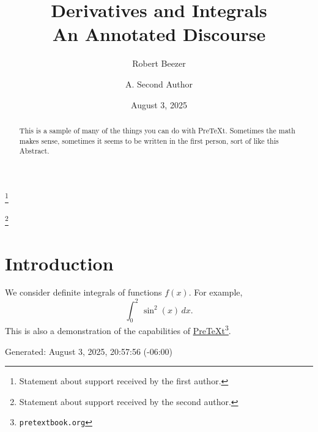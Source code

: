 \documentclass{amsart}
\theoremstyle{plain}%
\theoremstyle{definition}%
\theoremstyle{remark}%
\numberwithin{equation}{section}
\newcommand{\definiteintegral}[4]{\int_{#1}^{#2}\,#3\,d#4}
\begin{document}
%
\title[Derivatives and Integrals]{Derivatives and Integrals\\
{\small An Annotated Discourse}}
\author{Robert Beezer}
\address{Department of Mathematics and Computer Science\\
University of Puget Sound\\
Tacoma, Washington, USA
}
\thanks{Statement about support received by the first author.}
\author{A. Second Author}
\address{Department of Mathematics\\
University of Somewhere\\
Anytown, USA
}
\thanks{Statement about support received by the second author.}
\date{August 3, 2025}
\begin{abstract}
This is a sample of many of the things you can do with PreTeXt.  Sometimes the math makes sense, sometimes it seems to be written in the first person, sort of like this Abstract.%
\end{abstract}
\maketitle
%
%
\typeout{************************************************}
\typeout{************************************************}
%
\section{Introduction}\label{section-introduction}%
We consider definite integrals of functions \(f(x)\).  For example,%
\begin{equation*}
\definiteintegral{0}{2}{\sin^2(x)}{x}\text{.}
\end{equation*}
This is also a demonstration of the capabilities of \href{https://pretextbook.org}{PreTeXt}\footnote{\nolinkurl{pretextbook.org}\label{section-introduction-2-4}}.\label{section-introduction-2-5}%
\par
Generated: August 3, 2025, 20:57:56 (-06:00)%
%
%
\typeout{************************************************}
\typeout{************************************************}
%
\end{document}
